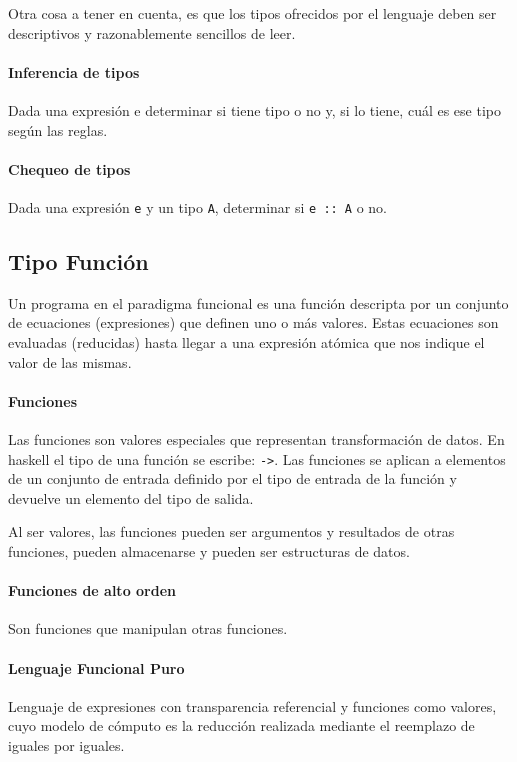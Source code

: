 \documentclass[10pt,a4paper]{article}
\begin{document}
Otra cosa a tener en cuenta, es que los tipos ofrecidos por el lenguaje deben ser descriptivos y razonablemente sencillos de leer.

\paragraph{Inferencia de tipos} Dada una expresión e determinar si tiene tipo o no y, si lo tiene, cuál es ese tipo según las reglas.

\paragraph{Chequeo de tipos} Dada una expresión \texttt{e} y un tipo \texttt{A}, determinar si \texttt{e :: A} o no.

\subsection{Tipo Función}
Un programa en el paradigma funcional es una función descripta por un conjunto de ecuaciones (expresiones) que definen uno o más valores. Estas ecuaciones son evaluadas (reducidas) hasta llegar a una expresión atómica que nos indique el valor de las mismas.

\paragraph{Funciones} Las funciones son valores especiales que representan transformación de datos. En haskell el tipo de una función se escribe: \texttt{->}. Las funciones se aplican a elementos de un conjunto de entrada definido por el tipo de entrada de la función y devuelve un elemento del tipo de salida.

Al ser valores, las funciones pueden ser argumentos y resultados de otras funciones, pueden almacenarse y pueden ser estructuras de datos.

\paragraph{Funciones de alto orden} Son funciones que manipulan otras funciones.

\paragraph{Lenguaje Funcional Puro} Lenguaje de expresiones con transparencia referencial y funciones como valores, cuyo modelo de cómputo es la reducción realizada mediante el reemplazo de iguales por iguales.
\end{document}
